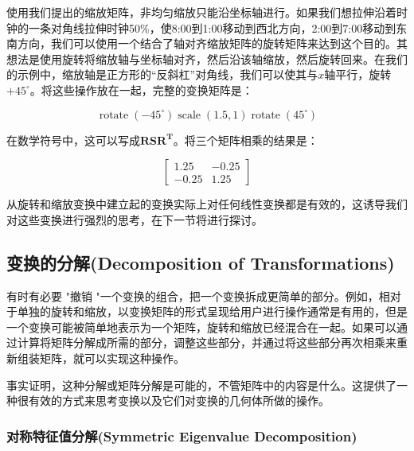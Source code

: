 \begin{example}
	使用我们提出的缩放矩阵，非均匀缩放只能沿坐标轴进行。如果我们想拉伸沿着时钟的一条对角线拉伸时钟50\%，使8:00到1:00移动到西北方向，2:00到7:00移动到东南方向，我们可以使用一个结合了轴对齐缩放矩阵的旋转矩阵来达到这个目的。其想法是使用旋转将缩放轴与坐标轴对齐，然后沿该轴缩放，然后旋转回来。在我们的示例中，缩放轴是正方形的“反斜杠”对角线，我们可以使其与$x$轴平行，旋转$+45^{\circ}$。将这些操作放在一起，完整的变换矩阵是：
	
	\begin{equation}
		\operatorname{rotate}\left(-45^{\circ}\right) \operatorname{scale}(1.5,1) \operatorname{rotate}\left(45^{\circ}\right)
		\nonumber
	\end{equation}
	
	在数学符号中，这可以写成$\mathbf{R}\mathbf{S}\mathbf{R}^{\mathbf{T}}$。将三个矩阵相乘的结果是：
	
	\begin{equation}
		\left[\begin{array}{cc}
			1.25 & -0.25 \\
			-0.25 & 1.25
		\end{array}\right]
	\nonumber
	\end{equation}
	
	从旋转和缩放变换中建立起的变换实际上对任何线性变换都是有效的，这诱导我们对这些变换进行强烈的思考，在下一节将进行探讨。
	
\end{example}

\subsection{变换的分解(Decomposition of Transformations)}

有时有必要 "撤销 "一个变换的组合，把一个变换拆成更简单的部分。例如，相对于单独的旋转和缩放，以变换矩阵的形式呈现给用户进行操作通常是有用的，但是一个变换可能被简单地表示为一个矩阵，旋转和缩放已经混合在一起。如果可以通过计算将矩阵分解成所需的部分，调整这些部分，并通过将这些部分再次相乘来重新组装矩阵，就可以实现这种操作。

事实证明，这种分解或矩阵分解是可能的，不管矩阵中的内容是什么。这提供了一种很有效的方式来思考变换以及它们对变换的几何体所做的操作。

\subsubsection*{\textcolor{structure3}{对称特征值分解(Symmetric Eigenvalue Decomposition)}}

